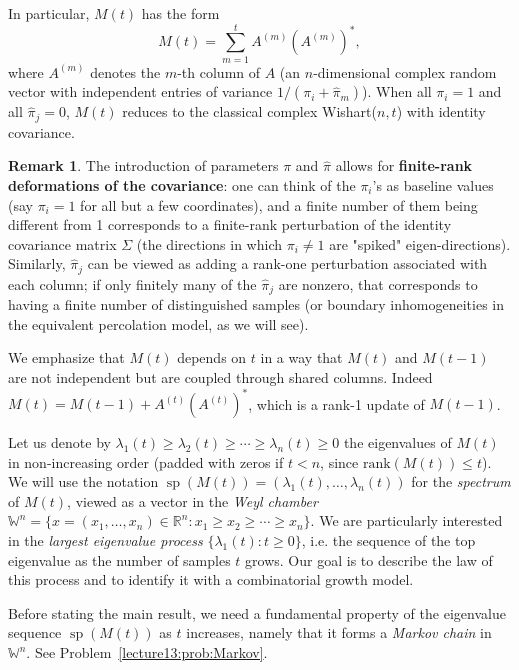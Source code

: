 \documentclass[letterpaper,11pt,oneside,reqno]{book}
\numberwithin{equation}{chapter}  %
\theoremstyle{definition}
\newtheorem{remark}[proposition]{Remark}
\begin{document}
In particular, $M(t)$ has the form
\[ M(t) = \sum_{m=1}^t A^{(m)} (A^{(m)})^*, \]
where $A^{(m)}$ denotes the $m$-th column of $A$ (an
$n$-dimensional complex random vector with independent
entries of variance $1/(\pi_i+\hat\pi_m)$). When all $\pi_i=1$ and all
$\hat\pi_j=0$, $M(t)$ reduces to the classical complex
Wishart($n,t$) with identity covariance.

\begin{remark}
	The introduction of parameters $\pi$ and $\hat\pi$ allows
	for \textbf{finite-rank deformations of the covariance}: one
	can think of the $\pi_i$'s as baseline values (say $\pi_i=1$
	for all but a few coordinates), and a finite number of them
	being different from 1 corresponds to a finite-rank
	perturbation of the identity covariance matrix $\Sigma$ (the
	directions in which $\pi_i\neq 1$ are "spiked"
	eigen-directions). Similarly, $\hat\pi_j$ can be viewed as
	adding a rank-one perturbation associated with each column;
	if only finitely many of the $\hat\pi_j$ are nonzero, that
	corresponds to having a finite number of distinguished
	samples (or boundary inhomogeneities in the equivalent
	percolation model, as we will see).
\end{remark}

We emphasize that $M(t)$
depends on $t$ in a way that $M(t)$ and $M(t-1)$ are not
independent but are coupled through shared columns. Indeed
$M(t) = M(t-1) + A^{(t)}(A^{(t)})^*$, which is a rank-1
update of $M(t-1)$.

\medskip
Let us denote by $\lambda_1(t)\ge \lambda_2(t)\ge \cdots \ge
\lambda_n(t)\ge 0$ the eigenvalues of $M(t)$ in
non-increasing order (padded with zeros if $t < n$, since
$\mathrm{rank}(M(t)) \le t$). We will use the notation
$\operatorname{sp}(M(t)) =
(\lambda_1(t),\dots,\lambda_n(t))$ for the \emph{spectrum}
of $M(t)$, viewed as a vector in the \emph{Weyl chamber}
$\mathbb{W}^n = \{x=(x_1,\dots,x_n)\in\mathbb{R}^n: x_1 \ge x_2 \ge
\cdots \ge x_n\}$. We are particularly interested in the
\emph{largest eigenvalue process}
$\{\lambda_1(t):t\ge0\}$, i.e. the sequence of the top
eigenvalue as the number of samples $t$ grows. Our goal is
to describe the law of this process and to identify it with
a combinatorial growth model.

Before stating the main result, we need a fundamental
property of the eigenvalue sequence
$\operatorname{sp}(M(t))$ as $t$ increases, namely that it
forms a \emph{Markov chain} in $\mathbb{W}^n$.
See Problem~\ref{lecture13:prob:Markov}.
\end{document}
